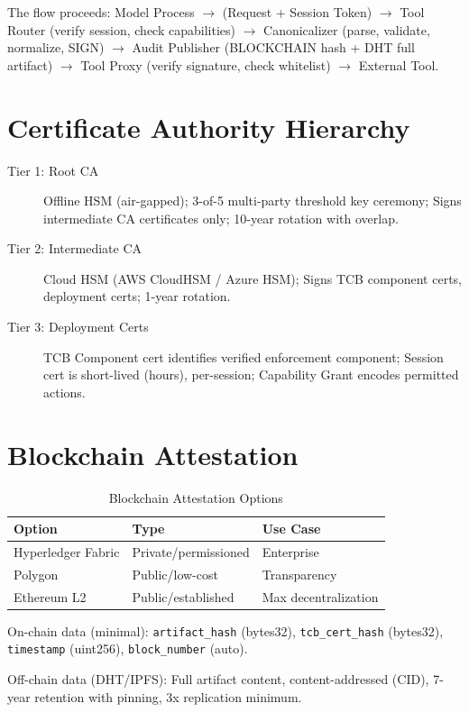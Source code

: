 \documentclass[11pt,letterpaper]{article}
\theoremstyle{definition}
\theoremstyle{remark}
\begin{document}
The flow proceeds: Model Process $\to$ (Request + Session Token) $\to$ Tool Router (verify session, check capabilities) $\to$ Canonicalizer (parse, validate, normalize, SIGN) $\to$ Audit Publisher (BLOCKCHAIN hash + DHT full artifact) $\to$ Tool Proxy (verify signature, check whitelist) $\to$ External Tool.

\section{Certificate Authority Hierarchy}

\begin{description}
\item[Tier 1: Root CA] Offline HSM (air-gapped); 3-of-5 multi-party threshold key ceremony; Signs intermediate CA certificates only; 10-year rotation with overlap.
\item[Tier 2: Intermediate CA] Cloud HSM (AWS CloudHSM / Azure HSM); Signs TCB component certs, deployment certs; 1-year rotation.
\item[Tier 3: Deployment Certs] TCB Component cert identifies verified enforcement component; Session cert is short-lived (hours), per-session; Capability Grant encodes permitted actions.
\end{description}

\section{Blockchain Attestation}

\begin{table}[h]
\centering
\begin{tabular}{@{}lll@{}}
\toprule
\textbf{Option} & \textbf{Type} & \textbf{Use Case} \\
\midrule
Hyperledger Fabric & Private/permissioned & Enterprise \\
Polygon & Public/low-cost & Transparency \\
Ethereum L2 & Public/established & Max decentralization \\
\bottomrule
\end{tabular}
\caption{Blockchain Attestation Options}
\end{table}

On-chain data (minimal): \texttt{artifact\_hash} (bytes32), \texttt{tcb\_cert\_hash} (bytes32), \texttt{timestamp} (uint256), \texttt{block\_number} (auto).

Off-chain data (DHT/IPFS): Full artifact content, content-addressed (CID), 7-year retention with pinning, 3x replication minimum.
\end{document}
